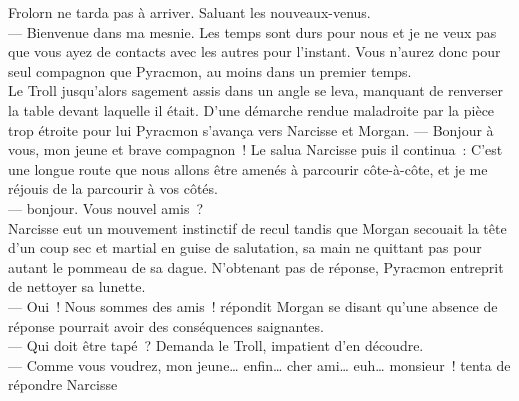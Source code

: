 \documentclass[french, a4paper, 12pt]{article}
\begin{document}
Frolorn ne tarda pas à arriver. Saluant les nouveaux-venus.\\
--- Bienvenue dans ma mesnie. Les temps sont durs pour nous et je ne veux pas que vous ayez de contacts avec les autres pour l'instant. Vous n'aurez donc pour seul compagnon que Pyracmon, au moins dans un premier temps.\\
Le Troll jusqu'alors sagement assis dans un angle se leva, manquant de renverser la table devant laquelle il était. D'une démarche rendue maladroite par la pièce trop étroite pour lui Pyracmon s'avança vers Narcisse et Morgan.
--- Bonjour à vous, mon jeune et brave compagnon~! Le salua Narcisse puis il continua~: C'est une longue route que nous allons être amenés à parcourir côte-à-côte, et je me réjouis de la parcourir à vos côtés. \\
--- bonjour. Vous nouvel amis~?\\
Narcisse eut un mouvement instinctif de recul tandis que Morgan secouait la tête d'un coup sec et martial en guise de salutation, sa main ne quittant pas pour autant le pommeau de sa dague. N'obtenant pas de réponse, Pyracmon entreprit de nettoyer sa lunette.\\
--- Oui~! Nous sommes des amis~! répondit Morgan se disant qu'une absence de réponse pourrait avoir des conséquences saignantes.\\
--- Qui doit être tapé~? Demanda le Troll, impatient d'en découdre.\\
--- Comme vous voudrez, mon jeune… enfin… cher ami… euh… monsieur~! tenta de répondre Narcisse \\
\end{document}
